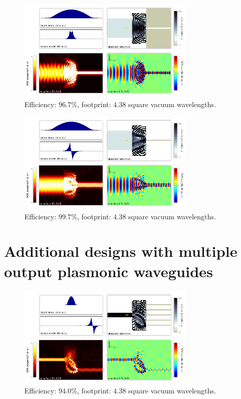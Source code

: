 \documentclass[letterpaper,10pt]{article}
\begin{document}
\begin{appendix}
\begin{figure}[htb]
    \centering
    \includegraphics[width=0.75\textwidth]{14}
    \caption{
        Efficiency: $96.7\%$,
        footprint: $4.38$ square vacuum wavelengths.
        }
\end{figure}


\begin{figure}[htb]
    \centering
    \includegraphics[width=0.75\textwidth]{15}
    \caption{
        Efficiency: $99.7\%$,
        footprint: $4.38$ square vacuum wavelengths.
        }
\end{figure}
\clearpage

\section{Additional designs with multiple output plasmonic waveguides}
\begin{figure}[htb]
    \centering
    \includegraphics[width=0.75\textwidth]{16}
    \caption{
        Efficiency: $94.0\%$,
        footprint: $4.38$ square vacuum wavelengths.
        }
\end{figure}



\end{appendix}
\end{document}
